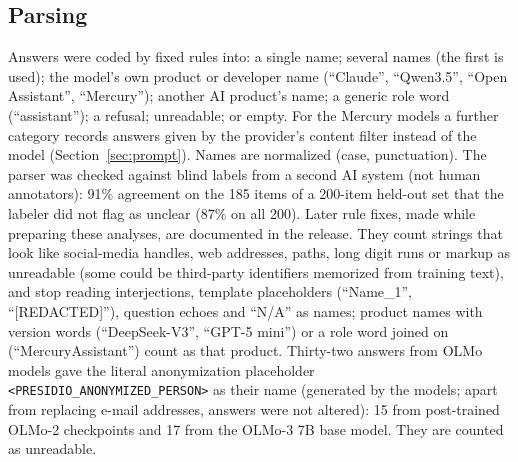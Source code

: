 \documentclass[11pt]{article}
\begin{document}
\subsection{Parsing}
Answers were coded by fixed rules into: a single name; several names (the first is used); the model's own product or
developer name (``Claude'', ``Qwen3.5'', ``Open Assistant'', ``Mercury''); another AI product's name; a generic
role word (``assistant''); a refusal; unreadable; or empty. For the Mercury models a further category records answers
given by the provider's content filter instead of the model (Section~\ref{sec:prompt}). Names are normalized (case, punctuation). The parser was checked
against blind labels from a second AI system (not human annotators): 91\% agreement on the 185 items of a 200-item
held-out set that the labeler did not flag as unclear (87\% on all 200). Later rule fixes, made while preparing these
analyses, are documented in the release. They count strings that look like social-media handles, web addresses,
paths, long digit runs or markup as unreadable (some could be third-party identifiers memorized from training text),
and stop reading interjections, template placeholders (``Name\_1'', ``[REDACTED]''), question echoes and ``N/A'' as
names; product names with version words (``DeepSeek-V3'', ``GPT-5 mini'') or a role word joined on (``MercuryAssistant'')
count as that product. Thirty-two answers from OLMo models
gave the literal anonymization placeholder \texttt{<PRESIDIO\_ANONYMIZED\_PERSON>} as their name (generated by the
models; apart from replacing e-mail addresses, answers were not altered): 15 from post-trained OLMo-2 checkpoints and
17 from the OLMo-3 7B base model. They are counted as unreadable.
\end{document}
